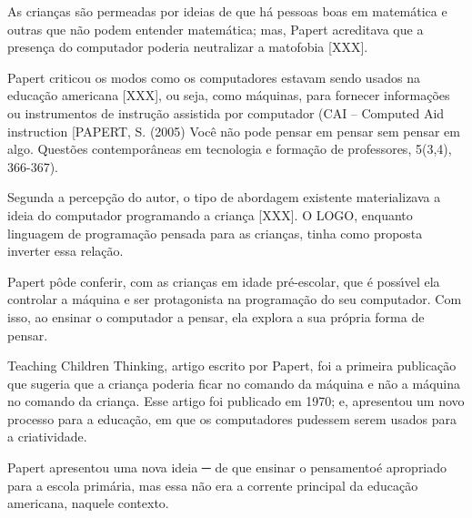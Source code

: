 \documentclass[
12pt,		%
openright,	%
twoside,  %
a4paper,			%
chapter=TITLE,		%
english,			%
french,				%
spanish,			%
brazil				%
]{USPSC-classe/USPSC_RedarTex}
\begin{document}
As crian\c{c}as s\~ao permeadas por ideias de que h\'a pessoas boas em matem\'atica e outras que n\~ao podem entender matem\'atica; mas, Papert acreditava que a presen\c{c}a do computador poderia neutralizar a matofobia [XXX].










Papert criticou os modos como os computadores estavam sendo usados na educa\c{c}\~ao americana [XXX], ou seja, como m\'aquinas, para fornecer informa\c{c}\~oes ou instrumentos de instru\c{c}\~ao assistida por computador (CAI – Computed Aid instruction [PAPERT, S. (2005) Voc\^e n\~ao pode pensar em pensar sem pensar em algo. Quest\~oes contempor\^aneas em tecnologia e forma\c{c}\~ao de professores, 5(3,4), 366-367).










Segunda a percep\c{c}\~ao do autor, o tipo de abordagem existente materializava a ideia do computador programando a crian\c{c}a [XXX]. O LOGO, enquanto linguagem de programa\c{c}\~ao pensada para as crian\c{c}as, tinha como proposta inverter essa rela\c{c}\~ao.










Papert p\^ode conferir, com as crian\c{c}as em idade pr\'e-escolar, que \'e poss\'{\i}vel ela controlar a m\'aquina e ser protagonista na programa\c{c}\~ao do seu computador. Com isso, ao ensinar o computador a pensar, ela explora a sua pr\'opria forma de pensar.










Teaching Children Thinking, artigo escrito por Papert, foi a primeira publica\c{c}\~ao que sugeria que a crian\c{c}a poderia ficar no comando da m\'aquina e n\~ao a m\'aquina no comando da crian\c{c}a.  Esse artigo  foi publicado em 1970; e,  apresentou um novo processo para a educa\c{c}\~ao, em que os computadores pudessem serem usados para a criatividade.










Papert apresentou uma nova ideia  ─ de que \textquotedbl ensinar o pensamento\textquotedbl   \'e apropriado para a escola prim\'aria, mas essa n\~ao era a corrente principal da educa\c{c}\~ao americana, naquele contexto.
\end{document}
